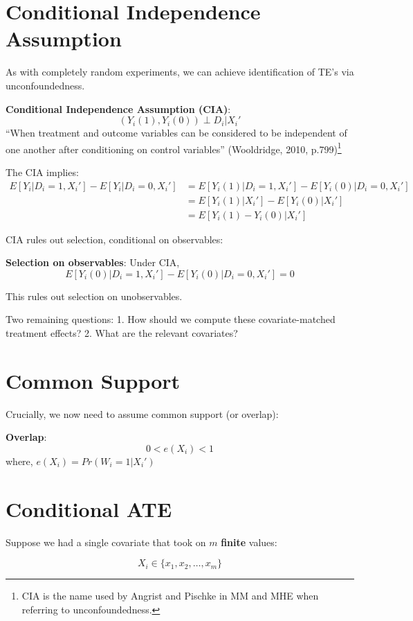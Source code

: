 \documentclass[
  letterpaper,
  DIV=11,
  numbers=noendperiod]{scrreprt}
\theoremstyle{definition}
\theoremstyle{remark}
\begin{document}
\section{Conditional Independence
Assumption}\label{conditional-independence-assumption}

As with completely random experiments, we can achieve identification of
TE's via unconfoundedness.

\textbf{Conditional Independence Assumption (CIA)}: \[
(Y_i(1), Y_i(0)) \perp D_i | X_i'
\] ``When treatment and outcome variables can be considered to be
independent of one another after conditioning on control variables''
(Wooldridge, 2010, p.799)\footnote{CIA is the name used by Angrist and
  Pischke in MM and MHE when referring to unconfoundedness.}

The CIA implies: \[
\begin{aligned}
E[Y_i|D_i=1,X_i'] - E[Y_i|D_i=0,X_i'] &= E[Y_i(1)|D_i=1,X_i'] - E[Y_i(0)|D_i=0,X_i'] \\
&= E[Y_i(1)|X_i'] - E[Y_i(0)|X_i'] \\
&= E[Y_i(1) - Y_i(0)|X_i']
\end{aligned}
\]

CIA rules out selection, conditional on observables:

\textbf{Selection on observables}: Under CIA, \[
E[Y_i(0)|D_i=1,X_i'] - E[Y_i(0)|D_i=0,X_i'] = 0
\]

This rules out selection on unobservables.

Two remaining questions: 1. How should we compute these
covariate-matched treatment effects? 2. What are the relevant
covariates?

\section{Common Support}\label{common-support}

Crucially, we now need to assume common support (or overlap):

\textbf{Overlap}: \[
0 < e(X_i) < 1
\] where, \(e(X_i) = Pr(W_i=1|X_i')\)

\section{Conditional ATE}\label{conditional-ate}

Suppose we had a single covariate that took on \(m\) \textbf{finite}
values:

\[
X_i \in \{x_1, x_2, \ldots, x_m\}
\]
\end{document}
